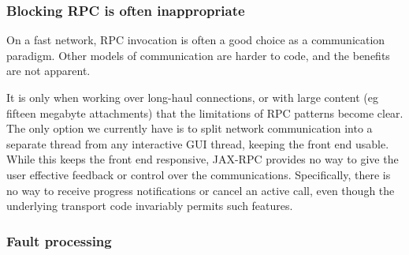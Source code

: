 %

\subsubsection{Blocking RPC is often inappropriate}

On a fast network, RPC invocation is often a good choice as a
communication paradigm. Other models of communication are harder to
code, and the benefits are not apparent.

It is only when working over long-haul connections, or with large
content (eg fifteen megabyte attachments) that the limitations
of RPC patterns become clear. The only option we currently have is to
split network communication into a separate thread from any
interactive GUI thread, keeping the front end usable. While this keeps
the front end responsive, JAX-RPC provides no way to give the user
effective feedback or control over the communications. Specifically,
there is no way to receive progress notifications or cancel an active
call, even though the underlying transport code invariably permits
such features.

\subsubsection{Fault processing}


